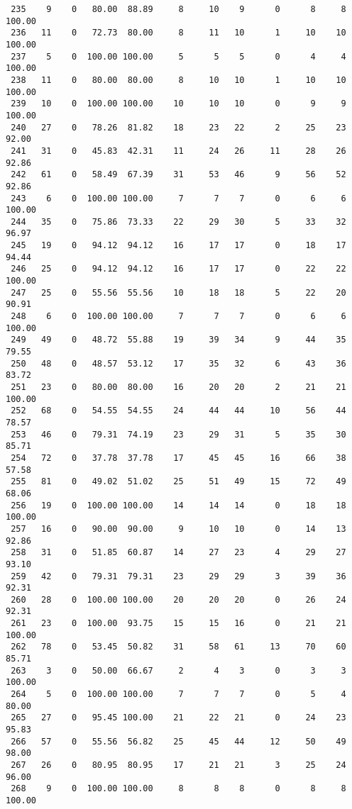 \begin{verbatim}
 235    9    0   80.00  88.89     8     10    9      0      8     8   100.00
 236   11    0   72.73  80.00     8     11   10      1     10    10   100.00
 237    5    0  100.00 100.00     5      5    5      0      4     4   100.00
 238   11    0   80.00  80.00     8     10   10      1     10    10   100.00
 239   10    0  100.00 100.00    10     10   10      0      9     9   100.00
 240   27    0   78.26  81.82    18     23   22      2     25    23    92.00
 241   31    0   45.83  42.31    11     24   26     11     28    26    92.86
 242   61    0   58.49  67.39    31     53   46      9     56    52    92.86
 243    6    0  100.00 100.00     7      7    7      0      6     6   100.00
 244   35    0   75.86  73.33    22     29   30      5     33    32    96.97
 245   19    0   94.12  94.12    16     17   17      0     18    17    94.44
 246   25    0   94.12  94.12    16     17   17      0     22    22   100.00
 247   25    0   55.56  55.56    10     18   18      5     22    20    90.91
 248    6    0  100.00 100.00     7      7    7      0      6     6   100.00
 249   49    0   48.72  55.88    19     39   34      9     44    35    79.55
 250   48    0   48.57  53.12    17     35   32      6     43    36    83.72
 251   23    0   80.00  80.00    16     20   20      2     21    21   100.00
 252   68    0   54.55  54.55    24     44   44     10     56    44    78.57
 253   46    0   79.31  74.19    23     29   31      5     35    30    85.71
 254   72    0   37.78  37.78    17     45   45     16     66    38    57.58
 255   81    0   49.02  51.02    25     51   49     15     72    49    68.06
 256   19    0  100.00 100.00    14     14   14      0     18    18   100.00
 257   16    0   90.00  90.00     9     10   10      0     14    13    92.86
 258   31    0   51.85  60.87    14     27   23      4     29    27    93.10
 259   42    0   79.31  79.31    23     29   29      3     39    36    92.31
 260   28    0  100.00 100.00    20     20   20      0     26    24    92.31
 261   23    0  100.00  93.75    15     15   16      0     21    21   100.00
 262   78    0   53.45  50.82    31     58   61     13     70    60    85.71
 263    3    0   50.00  66.67     2      4    3      0      3     3   100.00
 264    5    0  100.00 100.00     7      7    7      0      5     4    80.00
 265   27    0   95.45 100.00    21     22   21      0     24    23    95.83
 266   57    0   55.56  56.82    25     45   44     12     50    49    98.00
 267   26    0   80.95  80.95    17     21   21      3     25    24    96.00
 268    9    0  100.00 100.00     8      8    8      0      8     8   100.00

\end{verbatim}
